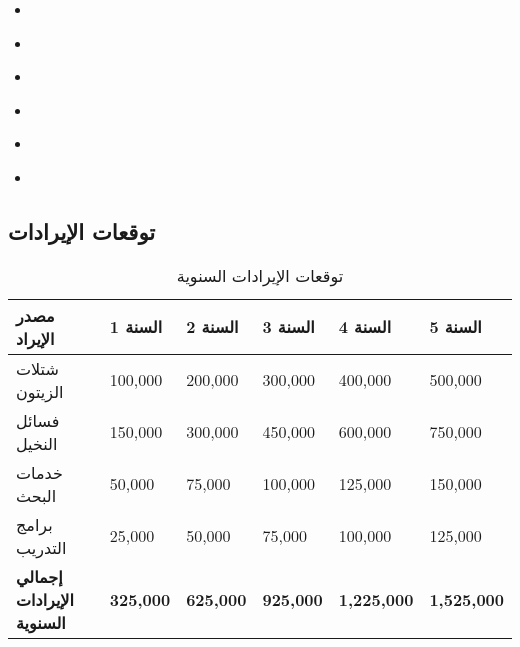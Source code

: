 \begin{itemize}
    \item \textbf{} 
    \item \textbf{} 
    \item \textbf{} 
    \item \textbf{} 
    \item \textbf{} 
    \item \textbf{} 
\end{itemize}

\subsection{توقعات الإيرادات}

\begin{table}[h]
\centering
\begin{tabular}{p{}p{}p{}p{}p{}p{}}
\hline
\textbf{مصدر الإيراد} & \textbf{السنة 1} & \textbf{السنة 2} & \textbf{السنة 3} & \textbf{السنة 4} & \textbf{السنة 5} \\
\hline
شتلات الزيتون & 100,000 & 200,000 & 300,000 & 400,000 & 500,000 \\
فسائل النخيل & 150,000 & 300,000 & 450,000 & 600,000 & 750,000 \\
خدمات البحث & 50,000 & 75,000 & 100,000 & 125,000 & 150,000 \\
برامج التدريب & 25,000 & 50,000 & 75,000 & 100,000 & 125,000 \\
\hline
\textbf{إجمالي الإيرادات السنوية} & \textbf{325,000} & \textbf{625,000} & \textbf{925,000} & \textbf{1,225,000} & \textbf{1,525,000} \\
\hline
\end{tabular}
\caption{توقعات الإيرادات السنوية}
\end{table}

